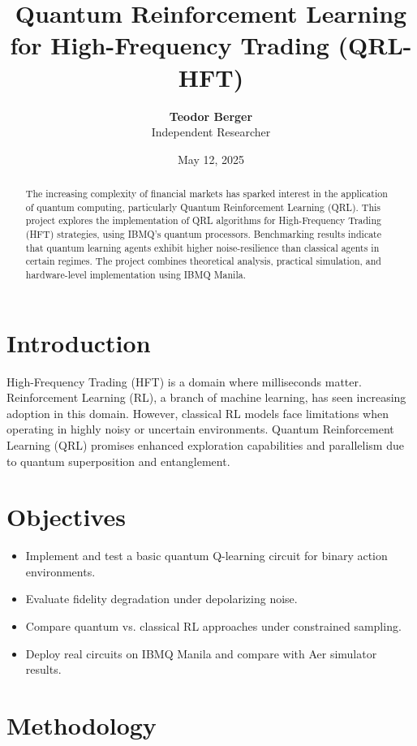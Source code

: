 \documentclass[a4paper,12pt]{article}
\title{\textbf{Quantum Reinforcement Learning for High-Frequency Trading (QRL-HFT)}}
\author{\textbf{Teodor Berger} \\ Independent Researcher}
\date{May 12, 2025}
\begin{document}
\maketitle

\begin{abstract}
The increasing complexity of financial markets has sparked interest in the application of quantum computing, particularly Quantum Reinforcement Learning (QRL). This project explores the implementation of QRL algorithms for High-Frequency Trading (HFT) strategies, using IBMQ’s quantum processors. Benchmarking results indicate that quantum learning agents exhibit higher noise-resilience than classical agents in certain regimes. The project combines theoretical analysis, practical simulation, and hardware-level implementation using IBMQ Manila.
\end{abstract}

\tableofcontents
\newpage

\section{Introduction}
High-Frequency Trading (HFT) is a domain where milliseconds matter. Reinforcement Learning (RL), a branch of machine learning, has seen increasing adoption in this domain. However, classical RL models face limitations when operating in highly noisy or uncertain environments. Quantum Reinforcement Learning (QRL) promises enhanced exploration capabilities and parallelism due to quantum superposition and entanglement.

\section{Objectives}
\begin{itemize}
    \item Implement and test a basic quantum Q-learning circuit for binary action environments.
    \item Evaluate fidelity degradation under depolarizing noise.
    \item Compare quantum vs. classical RL approaches under constrained sampling.
    \item Deploy real circuits on IBMQ Manila and compare with Aer simulator results.
\end{itemize}

\section{Methodology}
\end{document}
